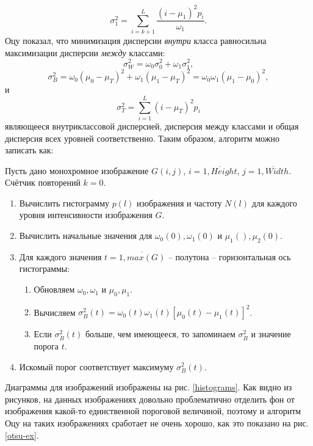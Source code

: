 \begin{equation}
	\sigma_1^2=\sum_{i=k+1}^L{\frac{(i-\mu_1)^2p_i}{\omega_1}}.
\end{equation}
Оцу показал, что минимизация дисперсии {\it внутри} класса 
равносильна максимизации дисперсии {\it между} классами:
\begin{equation}
	\sigma_W^2=\omega_0\sigma_0^2+\omega_1\sigma_1^2,
	\label{sigma_w}
\end{equation}
\begin{equation}
	\sigma_B^2=\omega_0(\mu_0-\mu_T)^2 + \omega_1(\mu_1-\mu_T)^2=
	\omega_0\omega_1(\mu_1-\mu_0)^2,
	\label{sigma_B}
\end{equation}
и
\begin{equation}
	\sigma_T^2=\sum^L_{i=1}{(i-\mu_T)^2p_i}
\end{equation}
являющееся внутриклассовой дисперсией, дисперсия между классами и общая
дисперсия всех уровней соответственно.
Таким образом, алгоритм можно записать как:

Пусть дано монохромное изображение $G(i,j)$, $i=\overline{1, Height}$,
$j=\overline{1,Width}$. Счётчик повторений $k=0$.
\begin{enumerate}
	\item Вычислить гистограмму $p(l)$ изображения и частоту $N(l)$ для
каждого уровня интенсивности изображения $G$.
	\item Вычислить начальные значения для $\omega_0(0),\omega_1(0)$ и 
$\mu_1(),\mu_2(0)$.
	\item Для каждого значения $t=\overline{1,max(G)}$ -- полутона --
горизонтальная ось гистограммы:
	\begin{enumerate}
		\item Обновляем $\omega_0,\omega_1$ и $\mu_0,\mu_1$.
		\item Вычисляем $\sigma_B^2(t)=\omega_0(t)\omega_1(t)[\mu_0(t)-
\mu_1(t)]^2$.
		\item Если $\sigma_B^2(t)$ больше, чем имеющееся, то запоминаем
$\sigma_B^2$ и значение порога $t$.
	\end{enumerate}
	\item Искомый порог соответствует максимуму $\sigma_B^2(t)$.
\end{enumerate}
 
Диаграммы для изображений изображены на рис. \ref{histograms}. Как видно из рисунков, на данных изображениях довольно
проблематично отделить фон от изображения какой-то единственной 
пороговой величиной, поэтому и алгоритм Оцу на таких изображениях 
сработает не очень хорошо, как это показано на рис. \ref{otsu-ex}.

